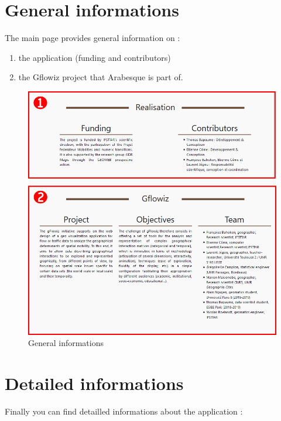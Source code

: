 \documentclass[]{book}
\providecommand{\tightlist}{%
  \setlength{\itemsep}{0pt}\setlength{\parskip}{0pt}}
\begin{document}
\hypertarget{general-informations}{%
\section{General informations}\label{general-informations}}

The main page provides general information on :

\begin{enumerate}
\def\labelenumi{\arabic{enumi}.}
\tightlist
\item
  the application (funding and
  contributors)
\item
  the Gflowiz project that Arabesque is part of.
\end{enumerate}

\begin{figure}
\centering
\includegraphics{images/main/05_arabesque_general_infos.png}
\caption{General informations}
\end{figure}

\hypertarget{detailed-informations}{%
\section{Detailed informations}\label{detailed-informations}}

Finally you can find detailled informations about the application :
\end{document}
